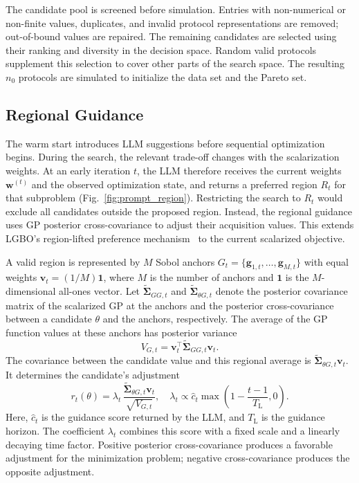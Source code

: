 The candidate pool is screened before simulation. Entries with non-numerical
or non-finite values, duplicates, and invalid protocol representations are
removed; out-of-bound values are repaired. The remaining candidates are
selected using their ranking and diversity in the decision space. Random
valid protocols supplement this selection to cover other parts of the search
space. The resulting $n_0$ protocols are simulated to initialize the data
set and the Pareto set.

\subsection{Regional Guidance}
\label{sec:region_pref}

The warm start introduces LLM suggestions before sequential
optimization begins. During the search, the relevant trade-off changes with
the scalarization weights. At an early iteration $t$, the LLM therefore receives the current
weights $\mathbf w^{(t)}$ and the observed optimization state, and returns a
preferred region $R_t$ for that subproblem
(Fig.~\ref{fig:prompt_region}). Restricting the search to $R_t$
would exclude all candidates outside the proposed region. Instead, the regional
guidance uses GP posterior cross-covariance to adjust their acquisition values. This
extends LGBO's region-lifted preference mechanism~\cite{ref5} to the current
scalarized objective.

A valid region is represented by $M$ Sobol anchors
$G_t=\{\mathbf g_{1,t},\ldots,\mathbf g_{M,t}\}$ with equal weights
$\mathbf v_t=(1/M)\mathbf 1$, where $M$ is the number of anchors and
$\mathbf 1$ is the $M$-dimensional all-ones vector. Let
$\widetilde{\boldsymbol\Sigma}_{GG,t}$ and
$\widetilde{\boldsymbol\Sigma}_{\theta G,t}$ denote the posterior covariance
matrix of the scalarized GP at the anchors and the posterior cross-covariance
between a candidate $\theta$ and the anchors, respectively. The average of
the GP function values at these anchors has posterior variance
\begin{equation}
 V_{G,t}=\mathbf v_t^{\top}
 \widetilde{\boldsymbol\Sigma}_{GG,t}\mathbf v_t.
 \label{eq:region_variance}
\end{equation}
The covariance between the candidate value and this regional average is
$\widetilde{\boldsymbol\Sigma}_{\theta G,t}\mathbf v_t$. It determines the
candidate's adjustment
\begin{equation}
 r_t(\theta)=
 \lambda_t\,
 \frac{\widetilde{\boldsymbol\Sigma}_{\theta G,t}\mathbf v_t}
 {\sqrt{V_{G,t}}},
 \quad
 \lambda_t\propto
 \widehat c_t\max\!\left(1-\frac{t-1}{T_{\mathrm L}},0\right).
 \label{eq:region_adjustment}
\end{equation}
Here, $\widehat c_t$ is the guidance score returned by the LLM, and
$T_{\mathrm L}$ is the guidance horizon. The coefficient $\lambda_t$ combines
this score with a fixed scale and a linearly decaying time factor. Positive posterior
cross-covariance produces a favorable adjustment for the minimization
problem; negative cross-covariance produces the opposite adjustment.

